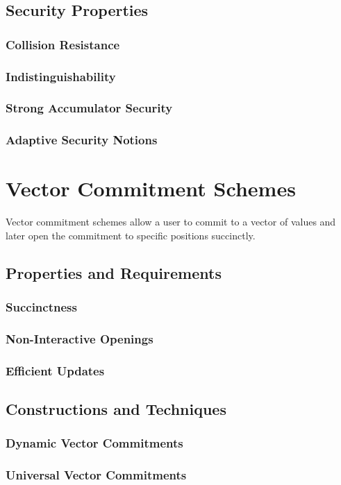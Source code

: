\documentclass{iacrtrans}
\begin{document}
\subsection{Security Properties}
\subsubsection{Collision Resistance}
\subsubsection{Indistinguishability}
\subsubsection{Strong Accumulator Security}
\subsubsection{Adaptive Security Notions}

\section{Vector Commitment Schemes}
Vector commitment schemes allow a user to commit to a vector of values and later open the commitment to specific positions succinctly.
\subsection{Properties and Requirements}
\subsubsection{Succinctness}
\subsubsection{Non-Interactive Openings}
\subsubsection{Efficient Updates}
\subsection{Constructions and Techniques}
\subsubsection{Dynamic Vector Commitments}
\subsubsection{Universal Vector Commitments}
\end{document}
